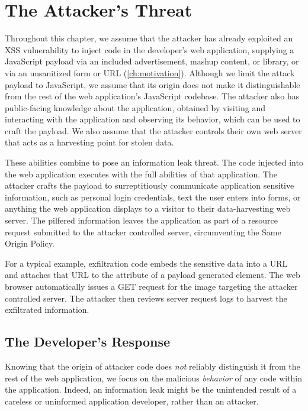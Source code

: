\section{The Attacker's Threat}
\label{sec:threat-model}

Throughout this chapter, we assume that the attacker has already exploited an XSS vulnerability to inject code in the developer's web application, supplying a JavaScript payload via an included advertisement, mashup content, or library, or via an unsanitized form or URL (\autoref{ch:motivation}).
Although we limit the attack payload to JavaScript, we assume that its origin does not make it distinguishable from the rest of the web application's JavaScript codebase.
The attacker also has public-facing knowledge about the application, obtained by visiting and interacting with the application and observing its behavior, which can be used to craft the payload.
We also assume that the attacker controls their own web server that acts as a harvesting point for stolen data.

These abilities combine to pose an information leak threat.
The code injected into the web application executes with the full abilities of that application.
The attacker crafts the payload to surreptitiously communicate application sensitive information, such as personal login credentials, text the user enters into forms, or anything the web application displays to a visitor to their data-harvesting web server.
The pilfered information leaves the application as part of a resource request submitted to the attacker controlled server, circumventing the Same Origin Policy.

For a typical example, exfiltration code embeds the sensitive data into a URL and attaches that URL to the  attribute of a payload generated  element.
The web browser automatically issues a GET request for the image targeting the attacker controlled server.
The attacker then reviews server request logs to harvest the exfiltrated information.

\subsection{The Developer's Response}

Knowing that the origin of attacker code does \emph{not} reliably distinguish it from the rest of the web application, we focus on the malicious \emph{behavior} of any code within the application.
Indeed, an information leak might be the unintended result of a careless or uninformed application developer, rather than an attacker.

